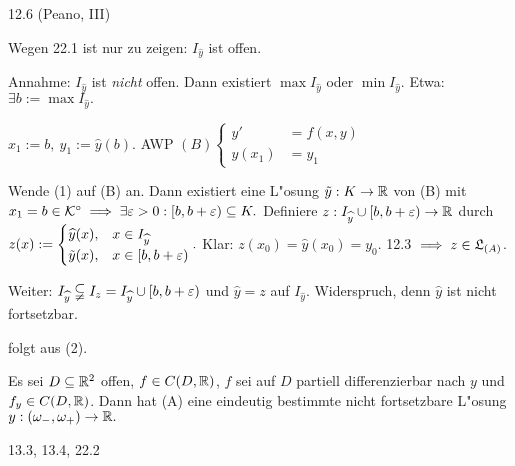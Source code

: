 \documentclass{article}
\begin{document}
\begin{beweis}
\begin{liste}
\item 12.6 (Peano, III)
\item Wegen 22.1 ist nur zu zeigen: $I_{\widehat{y}}$ ist offen.

Annahme: $I_{\widehat{y}}$ ist \emph{nicht} offen. Dann existiert $\max I_{\widehat{y}}$ oder $\min I_{\widehat{y}}.$ Etwa: $\exists b:=\max I_{\widehat{y}}.$

$x_1:=b,\ y_1:=\widehat{y}(b).$ AWP $(B)\begin{cases}y' & = f(x,y)\\ y(x_1) & = y_1\end{cases}$

Wende (1) auf (B) an. Dann existiert eine L"osung $\tilde{y}:K\to\mathbb{R}$ von (B) mit $x_1 = b\in\mathcal{K}^\circ \implies \exists \varepsilon>0: [b,b+\varepsilon) \subseteq K.$ Definiere $z:I_{\widehat{y}} \cup [b,b+\varepsilon) \to \mathbb{R}$ durch $z(x):=\begin{cases} \widehat{y}(x), & x\in I_{\widehat{y}}\\ \tilde{y}(x), & x \in [b,b+\varepsilon) \end{cases}.$ Klar: $z(x_0) = \widehat{y}(x_0) = y_0.$ 12.3 $\implies z \in \mathfrak{L}_{(A)}$.

Weiter: $I_{\widehat{y}} \subsetneqq I_z = I_{\widehat{y}}\cup[b,b+\varepsilon)$ und $\widehat{y} = z$ auf $I_{\widehat{y}}$. Widerspruch, denn $\widehat{y}$ ist nicht fortsetzbar.
\item folgt aus (2).
\end{liste}
\end{beweis}

\begin{folgerung}
Es sei $D\subseteq\mathbb{R}^2$ offen, $f \in C(D,\mathbb{R})$, $f$ sei auf $D$ partiell differenzierbar nach $y$ und $f_y\in C(D,\mathbb{R})$. Dann hat (A) eine eindeutig bestimmte nicht fortsetzbare L"osung $y:(\omega_-,\omega_+)\to\mathbb{R}.$
\end{folgerung}

\begin{beweis}
13.3, 13.4, 22.2
\end{beweis}
\end{document}
